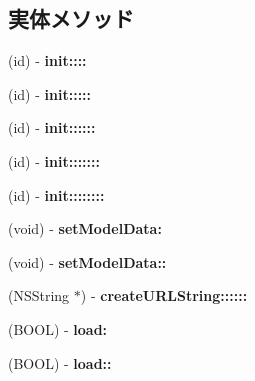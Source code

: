\subsection*{実体メソッド}
\begin{DoxyCompactItemize}
\item 
\hypertarget{interface_model_base_a686894de769757eabf294d376c19c7a3}{}(id) -\/ {\bfseries init\+::::}\label{interface_model_base_a686894de769757eabf294d376c19c7a3}

\item 
\hypertarget{interface_model_base_ab7135a52d17f51e0d8ef0ec7a5420873}{}(id) -\/ {\bfseries init\+:::::}\label{interface_model_base_ab7135a52d17f51e0d8ef0ec7a5420873}

\item 
\hypertarget{interface_model_base_a0bc50b277f7a0c77dd11bef092cb66be}{}(id) -\/ {\bfseries init\+::::::}\label{interface_model_base_a0bc50b277f7a0c77dd11bef092cb66be}

\item 
\hypertarget{interface_model_base_afb11782bf2dbf1fbdbd792b616f5b75e}{}(id) -\/ {\bfseries init\+:::::::}\label{interface_model_base_afb11782bf2dbf1fbdbd792b616f5b75e}

\item 
\hypertarget{interface_model_base_aa49b5b5342d7ad9c1dc758b056bbd970}{}(id) -\/ {\bfseries init\+::::::::}\label{interface_model_base_aa49b5b5342d7ad9c1dc758b056bbd970}

\item 
\hypertarget{interface_model_base_a185c6cda71d6a1b1ed4f2f8454d505cd}{}(void) -\/ {\bfseries set\+Model\+Data\+:}\label{interface_model_base_a185c6cda71d6a1b1ed4f2f8454d505cd}

\item 
\hypertarget{interface_model_base_a868e0e77c2db657fbb5b4549ad4bf537}{}(void) -\/ {\bfseries set\+Model\+Data\+::}\label{interface_model_base_a868e0e77c2db657fbb5b4549ad4bf537}

\item 
\hypertarget{interface_model_base_ade8c14cca867ff7ad25ab4e996b9ee6f}{}(N\+S\+String $\ast$) -\/ {\bfseries create\+U\+R\+L\+String\+::::::}\label{interface_model_base_ade8c14cca867ff7ad25ab4e996b9ee6f}

\item 
\hypertarget{interface_model_base_a8708f5dd32a807ae48043648d4c4768b}{}(B\+O\+O\+L) -\/ {\bfseries load\+:}\label{interface_model_base_a8708f5dd32a807ae48043648d4c4768b}

\item 
\hypertarget{interface_model_base_aa1a953fd915cedeedcabaeb1ff394e16}{}(B\+O\+O\+L) -\/ {\bfseries load\+::}\label{interface_model_base_aa1a953fd915cedeedcabaeb1ff394e16}


\end{DoxyCompactItemize}
